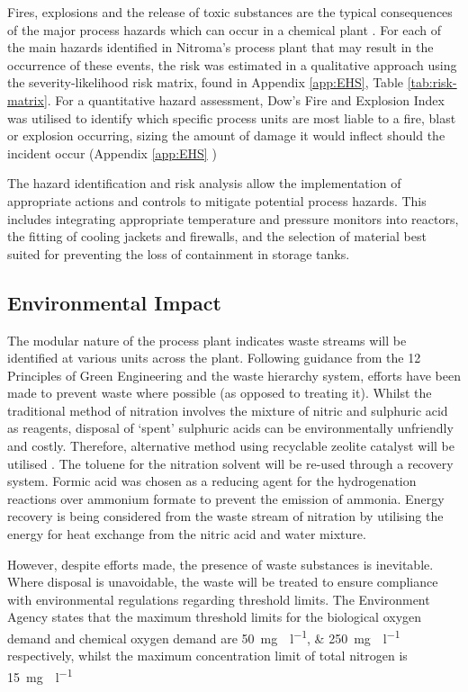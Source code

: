 Fires, explosions and the release of toxic substances are the typical consequences of the major process hazards which can occur in a chemical plant \cite{mannan_lees_2012}. For each of the main hazards identified in Nitroma's process plant that may result in the occurrence of these events, the risk was estimated in a qualitative approach using the severity-likelihood risk matrix, found in Appendix \ref{app:EHS}, Table \ref{tab:risk-matrix}. For a quantitative hazard assessment, Dow's Fire and Explosion Index was utilised to identify which specific process units are most liable to  a fire, blast or explosion occurring, sizing the amount of damage it would inflect should the incident occur (Appendix \ref{app:EHS} )

The hazard identification and risk analysis allow the implementation of appropriate actions and controls to mitigate potential process hazards. This includes integrating appropriate temperature and pressure monitors into reactors, the fitting of cooling jackets and firewalls, and the selection of material best suited for preventing the loss of containment in storage tanks.


\subsection{Environmental Impact}

The modular nature of the process plant indicates waste streams will be identified at various units across the plant. Following guidance from the 12 Principles of Green Engineering and the waste hierarchy system, efforts have been made to prevent waste where possible (as opposed to treating it). Whilst the traditional method of nitration involves the mixture of nitric and sulphuric acid as reagents, disposal of ‘spent’ sulphuric acids can be environmentally unfriendly and costly. Therefore, alternative method using recyclable zeolite catalyst will be utilised \cite{smith_superior_1996}. The toluene for the nitration solvent will be re-used through a recovery system. Formic acid was chosen as a reducing agent for the hydrogenation reactions over ammonium formate to prevent the emission of  ammonia. Energy recovery is being considered from the waste stream of nitration by utilising the energy for heat exchange from the nitric acid and water mixture. 

However, despite efforts made, the presence of waste substances is inevitable. Where disposal is unavoidable, the waste will be treated to ensure compliance with environmental regulations regarding threshold limits. The Environment Agency states that the maximum threshold limits for the biological oxygen demand and chemical oxygen demand are \SIlist{50;250}{\mg{}\per\l} respectively, whilst the maximum concentration limit of total nitrogen is \SI{15}{\mg{}\per\l} \cite{noauthor_waste_nodate}